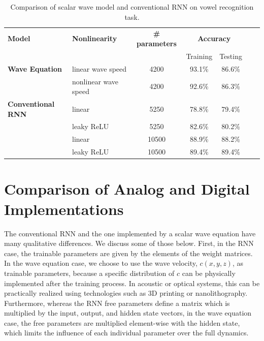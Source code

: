 \begin{table}[t]
    \centering
    \setlength{\tabcolsep}{6pt}
    \renewcommand{\arraystretch}{1.25}
    \begin{tabular}{llccccc}
        \hline\hline
        \textbf{Model} & \textbf{Nonlinearity} & \textbf{\# parameters} & \multicolumn{2}{c}{\textbf{Accuracy}} \\
        & & & Training & Testing \\
        \hline
        \textbf{Wave Equation} & linear wave speed & 4200 & 93.1\% & 86.6\% \\
          & nonlinear wave speed & 4200 & 92.6\% & 86.3\% \\
        \hline
        \textbf{Conventional RNN} & linear & 5250 & 78.8\% & 79.4\% \\
        & leaky ReLU & 5250 & 82.6\% & 80.2\% \\
        & linear & 10500  & 88.9\% & 88.2\% \\
        & leaky ReLU     & 10500 & 89.4\% & 89.4\% \\
        \hline\hline
    \end{tabular}
    \caption{Comparison of scalar wave model and conventional RNN on vowel recognition task.}
    \label{tab:final_table}
\end{table}

\section{Comparison of Analog and Digital Implementations}

The conventional RNN and the one implemented by a scalar wave equation have many qualitative differences.
We discuss some of those below. 
First, in the RNN case, the trainable parameters are given by the elements of the weight matrices.  
In the wave equation case, we choose to use the wave velocity, $c(x,y,z)$, as trainable parameters, because a specific distribution of $c$ can be physically implemented after the training process.  
In acoustic or optical systems, this can be practically realized using technologies such as 3D printing or nanolithography. 
Furthermore, whereas the RNN free parameters define a matrix which is multiplied by the input, output, and hidden state vectors, in the wave equation case, the free parameters are multiplied element-wise with the hidden state, which limits the influence of each individual parameter over the full dynamics.  


